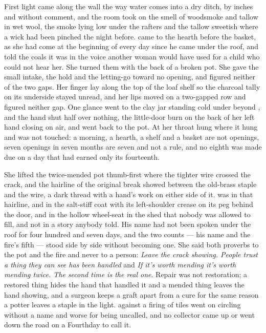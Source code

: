 First light came along the wall the way water comes into a dry ditch, by inches and without comment, and the room took on the smell of woodsmoke and tallow in wet wool, the smoke lying low under the rafters and the tallow sweetish where a wick had been pinched the night before.  came to the hearth before the basket, as she had come at the beginning of every day since he came under the roof, and told the coals it was  in the voice another woman would have used for a child who could not hear her. She turned them with the back of a broken pot. She gave the small intake, the hold and the letting-go toward no opening, and figured neither of the two gaps. Her finger lay along the top of the loaf shelf so the charcoal tally on its underside stayed unread, and her lips moved on a two-gapped row and figured neither gap. One glance went to the clay jar standing cold under  beyond , and the hand shut half over nothing, the little-door burn on the back of her left hand closing on air, and went back to the pot. At her throat  hung where it hung and was not touched: a morning, a hearth, a shelf and a basket are not openings, seven openings in seven months are seven and not a rule, and no eighth was made due on a day that had earned only its fourteenth.

She lifted the twice-mended pot thumb-first where the tighter wire crossed the crack, and the hairline of the original break showed between the old-brass staple and the wire, a dark thread with a hand's work on either side of it.  was in that hairline, and in the salt-stiff coat with its left-shoulder crease on its peg behind the door, and in the hollow wheel-seat in the shed that nobody was allowed to fill, and not in a story anybody told. His name had not been spoken under the roof for four hundred and seven days, and the two counts --- his name and the fire's fifth --- stood side by side without becoming one. She said both proverbs to the pot and the fire and never to a person: \emph{Leave the crack showing. People trust a thing they can see has been handled} and \emph{If it's worth mending it's worth mending twice. The second time is the real one}. Repair was not restoration; a restored thing hides the hand that handled it and a mended thing leaves the hand showing, and a surgeon keeps a graft apart from a cure for the same reason a potter leaves a staple in the light.  against a firing of tiles went on circling without a name and worse for being uncalled, and no collector came up or went down the road on a Fourthday to call it.

